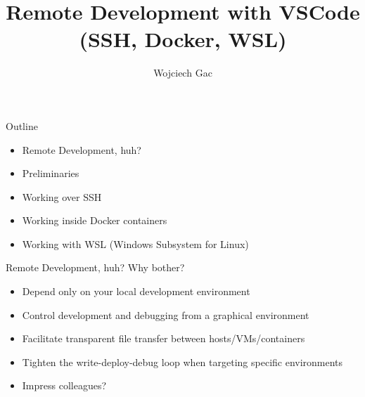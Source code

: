 \documentclass[pdf,xcolor=dvipsnames,noparindent]{beamer}
\title{Remote Development with VSCode (SSH, Docker, WSL)}
\author{Wojciech Gac}
\begin{document}
\begin{frame}
	\titlepage
\end{frame}


	  

\begin{frame}{Outline}
  \pause
  \begin{itemize}
  \item Remote Development, huh?
    \pause
  \item Preliminaries
    \pause
  \item Working over SSH
    \pause
  \item Working inside Docker containers
    \pause
  \item Working with WSL (Windows Subsystem for Linux)
    \pause
  \end{itemize}
\end{frame}

\begin{frame}{Remote Development, huh?}
  Why bother?
  \pause
  \begin{itemize}
  \item Depend only on your local development environment
    \pause
  \item Control development and debugging from a graphical environment
    \pause
  \item Facilitate transparent file transfer between hosts/VMs/containers
    \pause
  \item Tighten the write-deploy-debug loop when targeting specific environments
    \pause
  \item Impress colleagues?
  \end{itemize}
\end{frame}
\end{document}
